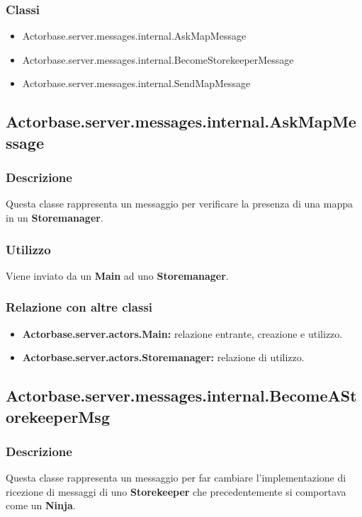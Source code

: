 \documentclass[a4paper]{article}
\begin{document}
			\subsubsection{Classi}
				\begin{itemize}
					\item Actorbase.server.messages.internal.AskMapMessage
					\item Actorbase.server.messages.internal.BecomeStorekeeperMessage
					\item Actorbase.server.messages.internal.SendMapMessage
				\end{itemize}
			
		\subsection{Actorbase.server.messages.internal.AskMapMessage}
			\subsubsection{Descrizione}
				Questa classe rappresenta un messaggio per verificare la presenza di una mappa in un \textbf{Storemanager}.
				
			\subsubsection{Utilizzo}
				Viene inviato da un \textbf{Main} ad uno \textbf{Storemanager}.
				
			\subsubsection{Relazione con altre classi}
				\begin{itemize}
					\item \textbf{Actorbase.server.actors.Main:} relazione entrante, creazione e utilizzo.
					\item \textbf{Actorbase.server.actors.Storemanager:} relazione di utilizzo.
				\end{itemize}
				
		\subsection{Actorbase.server.messages.internal.BecomeAStorekeeperMsg}
			\subsubsection{Descrizione}
				Questa classe rappresenta un messaggio per far cambiare l'implementazione di ricezione di messaggi di uno \textbf{Storekeeper} 
				che precedentemente si comportava come un \textbf{Ninja}.
				
\end{document}

